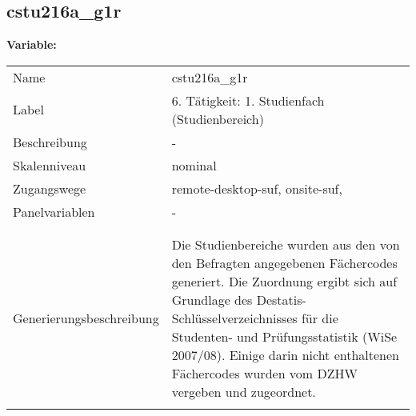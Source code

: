 	
	
	\subsection{cstu216a\_g1r}
	\label{subSection:cstu216a_g1r}

	\noindent\textbf{Variable:}\\
		\begin{tabular}{lL{11.3cm}}
			\label{tableVariable:cstu216a_g1r}
			Name & cstu216a\_g1r \\
			Label & 6. Tätigkeit: 1. Studienfach (Studienbereich) \\
			Beschreibung & - \\
			Skalenniveau & nominal \\
			Zugangswege &
				remote-desktop-suf,
				onsite-suf,
 \\
			Panelvariablen & -
			 \\
			 \\
 \\
					Generierungsbeschreibung & Die Studienbereiche wurden aus den von den Befragten angegebenen Fächercodes generiert. Die Zuordnung ergibt sich auf Grundlage des Destatis-Schlüsselverzeichnisses für die Studenten- und Prüfungsstatistik (WiSe 2007/08). Einige darin nicht enthaltenen Fächercodes wurden vom DZHW vergeben und zugeordnet. 
				 \\	
			 \\
		\end{tabular}






